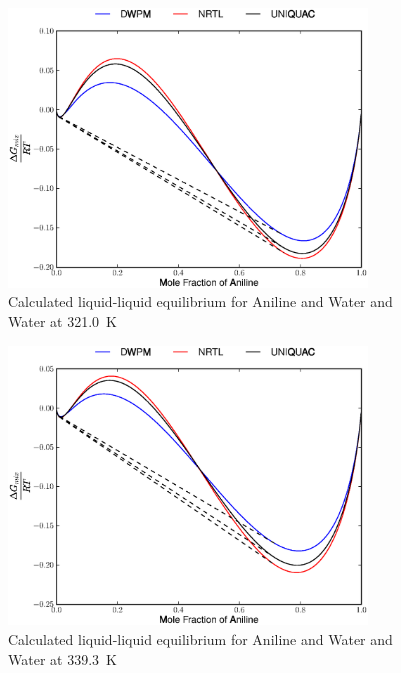 \begin{figure}[hp]
\centering
\includegraphics[width = 0.85\textwidth]{Results_Parts/BinaryParams/aniline-water/AllModelsGibbsPlots/T_321.0.eps}
\caption{Calculated liquid-liquid equilibrium for Aniline and Water and Water at 321.0~$\mathrm{K}$} 
\end{figure}

\begin{figure}[hp]
\centering
\includegraphics[width = 0.85\textwidth]{Results_Parts/BinaryParams/aniline-water/AllModelsGibbsPlots/T_339.3.eps}
\caption{Calculated liquid-liquid equilibrium for Aniline and Water and Water at 339.3~$\mathrm{K}$} 
\end{figure}

